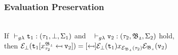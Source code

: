 \subsubsection{Evaluation Preservation}
\begin{lemma} ~\\
If $\typrule
		{\texttt{t}_{1}}
		{\tau_{1}}
		{\bot}
		{\Sigma_1}$  
and 
	\mbox{
		$\typrule
			{\texttt{v}_{2}}
			{\tau_{2}}
			{\mf{B_{2}}}
			{\Sigma_2}$}	
hold, \\ 
then
$\e_{\bot}
	(\sbst
		{\texttt{t}_{1}}
		{x^{\mf{B_{2}}}_{\tau_{2}}}
		{\texttt{v}_{2}})
= \sbst
		{\e_{\bot}(\texttt{t}_{1})}
		{x_{\e_{\mf{B_{2}}}(\tau_{2})}}
		{\e_{\mf{B_{2}}}(\texttt{v}_{2})}$
\label{Substitution under erasure}
\end{lemma}

